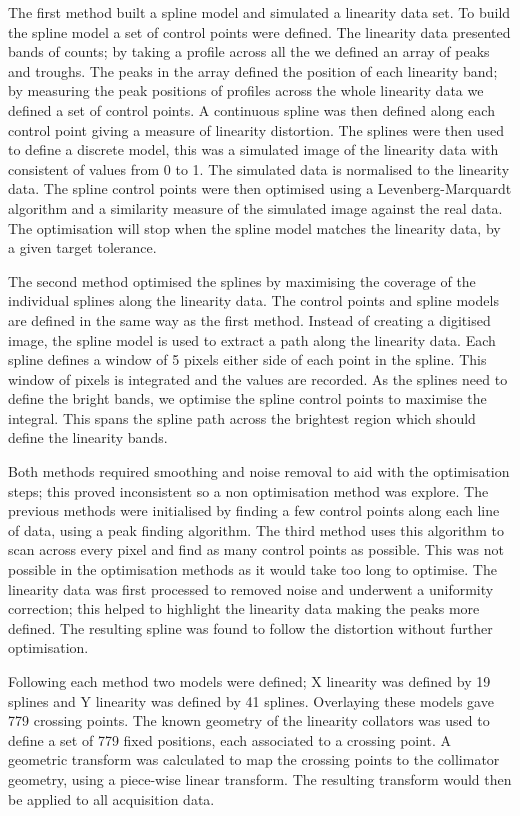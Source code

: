 The first method built a spline model and simulated a linearity data set. To build the spline model a set of control points were defined. The linearity data presented bands of counts; by taking a profile across all the we defined an array of peaks and troughs. The peaks in the array defined the position of each linearity band; by measuring the peak positions of profiles across the whole linearity data we defined a set of control points. A continuous spline was then defined along each control point giving a measure of linearity distortion. The splines were then used to define a discrete model, this was a simulated image of the linearity data with consistent of values from 0 to 1. The simulated data is normalised to the linearity data. The spline control points were then optimised using a Levenberg-Marquardt algorithm and a similarity measure of the simulated image against the real data. The optimisation will stop when the spline model matches the linearity data, by a given target tolerance. 

The second method optimised the splines by maximising the coverage of the individual splines along the linearity data. The control points and spline models are defined in the same way as the first method. Instead of creating a digitised image, the spline model is used to extract a path along the linearity data. Each spline defines a window of 5 pixels either side of each point in the spline. This window of pixels is integrated and the values are recorded. As the splines need to define the bright bands, we optimise the spline control points to maximise the integral. This spans the spline path across  the brightest region which should define the linearity bands. 

Both methods required smoothing and noise removal to aid with the optimisation steps; this proved inconsistent so a non optimisation method was explore. The previous methods were initialised by finding a few control points along each line of data, using a peak finding algorithm. The third method uses this algorithm to scan across every pixel and find as many control points as possible. This was not possible in the optimisation methods as it would take too long to optimise. The linearity data was first processed to removed noise and underwent a uniformity correction; this helped to highlight the linearity data making the peaks more defined. The resulting spline was found to follow the distortion without further optimisation. 

Following each method two models were defined; X linearity was defined by 19 splines and Y linearity was defined by 41 splines. Overlaying these models gave 779 crossing points. The known geometry of the linearity collators was used to define a set of 779 fixed positions, each associated to a crossing point. A geometric transform was calculated to map the crossing points to the collimator geometry, using a piece-wise linear transform. The resulting transform would then be applied to all acquisition data.

